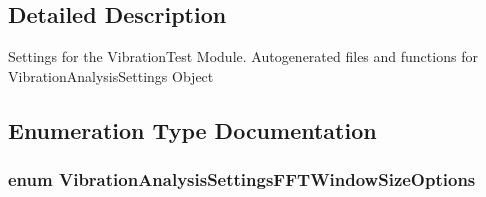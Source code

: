 \subsection{\-Detailed \-Description}
\-Settings for the \-Vibration\-Test \-Module. \-Autogenerated files and functions for \-Vibration\-Analysis\-Settings \-Object 

\subsection{\-Enumeration \-Type \-Documentation}
\hypertarget{group___vibration_analysis_settings_ga60caf653b6432a42f9ddd04e258db7b1}{
\subsubsection[{\-Vibration\-Analysis\-Settings\-F\-F\-T\-Window\-Size\-Options}]{\setlength{\rightskip}{0pt plus 5cm}enum {\bf \-Vibration\-Analysis\-Settings\-F\-F\-T\-Window\-Size\-Options}}}\label{group___vibration_analysis_settings_ga60caf653b6432a42f9ddd04e258db7b1}
